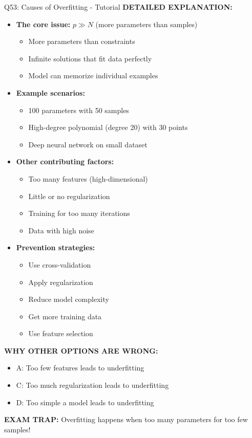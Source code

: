 \documentclass[8pt]{beamer}
\begin{document}
\begin{frame}{Q53: Causes of Overfitting - Tutorial}
		\vspace{0.05cm}
		\textbf{DETAILED EXPLANATION:}
		\begin{itemize}
			\item \textbf{The core issue:} $p \gg N$ (more parameters than samples)
			\begin{itemize}
				\item More parameters than constraints
				\item Infinite solutions that fit data perfectly
				\item Model can memorize individual examples
			\end{itemize}
			\item \textbf{Example scenarios:}
			\begin{itemize}
				\item 100 parameters with 50 samples
				\item High-degree polynomial (degree 20) with 30 points
				\item Deep neural network on small dataset
			\end{itemize}
			\item \textbf{Other contributing factors:}
			\begin{itemize}
				\item Too many features (high-dimensional)
				\item Little or no regularization
				\item Training for too many iterations
				\item Data with high noise
			\end{itemize}
			\item \textbf{Prevention strategies:}
			\begin{itemize}
				\item Use cross-validation
				\item Apply regularization
				\item Reduce model complexity
				\item Get more training data
				\item Use feature selection
			\end{itemize}
		\end{itemize}
		
		\vspace{0.05cm}
		\textcolor{myred}{\textbf{WHY OTHER OPTIONS ARE WRONG:}}
		\begin{itemize}
			\item \textcolor{myred}{A:} Too few features leads to underfitting
			\item \textcolor{myred}{C:} Too much regularization leads to underfitting
			\item \textcolor{myred}{D:} Too simple a model leads to underfitting
		\end{itemize}
		
		\textcolor{myred}{\textbf{EXAM TRAP:}} Overfitting happens when too many parameters for too few samples!
	\end{frame}
	
\end{document}
